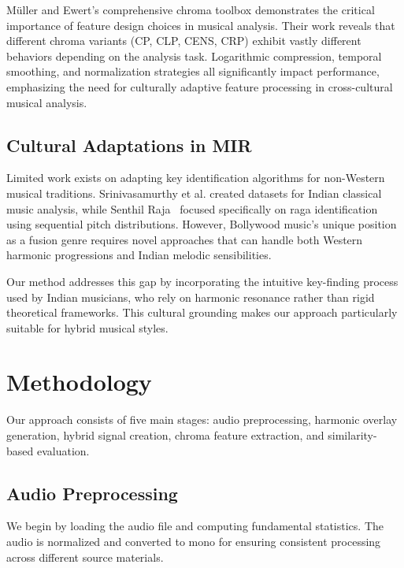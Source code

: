 \documentclass[10pt,twocolumn]{article}
\begin{document}
Müller and Ewert's comprehensive chroma toolbox demonstrates the critical importance of feature design choices in musical analysis.
Their work reveals that different chroma variants (CP, CLP, CENS, CRP) exhibit vastly different behaviors depending on the analysis task.
Logarithmic compression, temporal smoothing, and normalization strategies all significantly impact performance, emphasizing the need for culturally adaptive feature processing in cross-cultural musical analysis.

\subsection{Cultural Adaptations in MIR}\label{subsec:cultural-adaptations-in-mir}
Limited work exists on adapting key identification algorithms for non-Western musical traditions.
Srinivasamurthy et al. \cite{srinivasamurthy2021saraga}created datasets for Indian classical music analysis, while Senthil Raja~\cite{raja2023sequential} focused specifically on raga identification using sequential pitch distributions.
However, Bollywood music's unique position as a fusion genre requires novel approaches that can handle both Western harmonic progressions and Indian melodic sensibilities.

Our method addresses this gap by incorporating the intuitive key-finding process used by Indian musicians, who rely on harmonic resonance rather than rigid theoretical frameworks.
This cultural grounding makes our approach particularly suitable for hybrid musical styles.

\section{Methodology}\label{sec:methodology}
Our approach consists of five main stages: audio preprocessing, harmonic overlay generation, hybrid signal creation, chroma feature extraction, and similarity-based evaluation.

\subsection{Audio Preprocessing}\label{subsec:audio-preprocessing}
We begin by loading the audio file and computing fundamental statistics.
The audio is normalized and converted to mono for ensuring consistent processing across different source materials.
\end{document}
